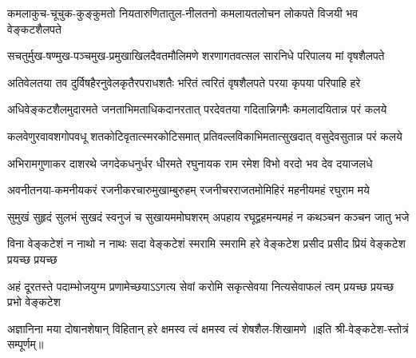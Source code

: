 
\twolineshloka
{कमलाकुच-चूचुक-कुङ्कुमतो नियतारुणितातुल-नीलतनो}
{कमलायतलोचन लोकपते विजयी भव वेङ्कटशैलपते}

\twolineshloka
{सचतुर्मुख-षण्मुख-पञ्चमुख-प्रमुखाखिलदैवतमौलिमणे}
{शरणागतवत्सल सारनिधे परिपालय मां वृषशैलपते}

\twolineshloka
{अतिवेलतया तव दुर्विषहैरनुवेलकृतैरपराधशतैः}
{भरितं त्वरितं वृषशैलपते परया कृपया परिपाहि हरे}

\twolineshloka
{अधिवेङ्कटशैलमुदारमते जनताभिमताधिकदानरतात्}
{परदेवतया गदितान्निगमैः कमलादयितान्न परं कलये}

\twolineshloka
{कलवेणुरवावशगोपवधू शतकोटिवृतात्स्मरकोटिसमात्}
{प्रतिवल्लविकाभिमतात्सुखदात् वसुदेवसुतान्न परं कलये}

\twolineshloka
{अभिरामगुणाकर दाशरथे जगदेकधनुर्धर धीरमते}
{रघुनायक राम रमेश विभो वरदो भव देव दयाजलधे}

\twolineshloka
{अवनीतनया-कमनीयकरं रजनीकरचारुमुखाम्बुरुहम्}
{रजनीचरराजतमोमिहिरं महनीयमहं रघुराम मये}

\twolineshloka
{सुमुखं सुहृदं सुलभं सुखदं स्वनुजं च सुखायममोघशरम्}
{अपहाय रघूद्वहमन्यमहं न कथञ्चन कञ्चन जातु भजे}

\fourlineindentedshloka
{विना वेङ्कटेशं न नाथो न नाथः}
{सदा वेङ्कटेशं स्मरामि स्मरामि}
{हरे वेङ्कटेश प्रसीद प्रसीद}
{प्रियं वेङ्कटेश प्रयच्छ प्रयच्छ}%

\fourlineindentedshloka
{अहं दूरतस्ते पदाम्भोजयुग्म}
{प्रणामेच्छयाऽऽगत्य सेवां करोमि}
{सकृत्सेवया नित्यसेवाफलं त्वम्}
{प्रयच्छ प्रयच्छ प्रभो वेङ्कटेश}

\twolineshloka
{अज्ञानिना मया दोषानशेषान् विहितान् हरे}
{क्षमस्व त्वं क्षमस्व त्वं शेषशैल-शिखामणे}
॥इति श्री-वेङ्कटेश-स्तोत्रं सम्पूर्णम्॥
